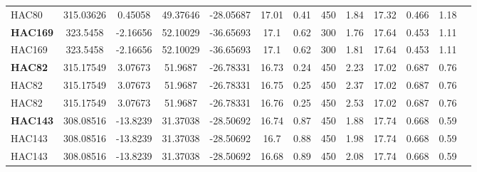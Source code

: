 \documentclass[a4paper,12pt]{article}
\begin{document}
\begin{longtable}{@{\extracolsep{\fill}}lccclccccrlll@{}}
HAC80 & 315.03626 & 0.45058 & 49.37646 & -28.05687 & 17.01 & 0.41 & 450 & 1.84 & 17.32 & 0.466 & 1.18 \\
\textbf{HAC169} & 323.5458 & -2.16656 & 52.10029 & -36.65693 & 17.1 & 0.62 & 300 & 1.76 & 17.64 & 0.453 & 1.11 \\
HAC169 & 323.5458 & -2.16656 & 52.10029 & -36.65693 & 17.1 & 0.62 & 300 & 1.81 & 17.64 & 0.453 & 1.11 \\
\textbf{HAC82} & 315.17549 & 3.07673 & 51.9687 & -26.78331 & 16.73 & 0.24 & 450 & 2.23 & 17.02 & 0.687 & 0.76 \\
HAC82 & 315.17549 & 3.07673 & 51.9687 & -26.78331 & 16.75 & 0.25 & 450 & 2.37 & 17.02 & 0.687 & 0.76 \\
HAC82 & 315.17549 & 3.07673 & 51.9687 & -26.78331 & 16.76 & 0.25 & 450 & 2.53 & 17.02 & 0.687 & 0.76 \\
\textbf{HAC143} & 308.08516 & -13.8239 & 31.37038 & -28.50692 & 16.74 & 0.87 & 450 & 1.88 & 17.74 & 0.668 & 0.59 \\
HAC143 & 308.08516 & -13.8239 & 31.37038 & -28.50692 & 16.7 & 0.88 & 450 & 1.98 & 17.74 & 0.668 & 0.59 \\
HAC143 & 308.08516 & -13.8239 & 31.37038 & -28.50692 & 16.68 & 0.89 & 450 & 2.08 & 17.74 & 0.668 & 0.59 \\
  \hline
 \end{longtable}
\end{document}
